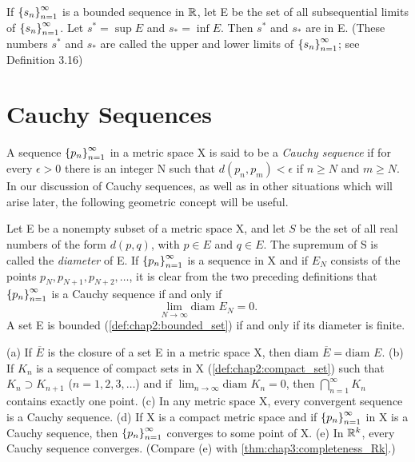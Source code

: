 \begin{theorem} %
  \label{thm:chap3:bounded_seq_lim_sup_inf_exist}
  If $\left\{ s_n \right\}_{n=1}^\infty$ is a bounded sequence in $\mathbb{R}$, let E be the set
  of all subsequential limits of $\left\{ s_n \right\}_{n=1}^\infty$. Let $s^* = \sup E$
  and $s_* = \inf E$. Then $s^*$ and $s_*$ are in E.
  (These numbers $s^*$ and $s_*$ are called the upper and lower
  limits of $\left\{ s_n \right\}_{n=1}^\infty$; see Definition 3.16)
\end{theorem}

\section{Cauchy Sequences}
\label{sec:chap3:cauchy_sequences}

\begin{definition} %
  \label{def:chap3:cauchy_sequence}
  A sequence $\left\{ p_n \right\}_{n=1}^\infty$ in a metric space X is said to be a
  \emph{Cauchy sequence} if for every $\epsilon > 0$ there is an
  integer N such that $d(p_n, p_m) < \epsilon$ if $n \ge N$ and $m \ge N$.
  In our discussion of Cauchy sequences, as well as in other
  situations which will arise later, the following geometric concept
  will be useful.
\end{definition}

\begin{definition} %
  \label{def:chap3:diameter_bounded}
  Let E be a nonempty subset of a metric space X, and let $S$ be the
  set of all real numbers of the form $d(p, q)$, with $p \in E$ and
  $q \in E$. The supremum of S is called the \emph{diameter} of E.
  If $\left\{ p_n \right\}_{n=1}^\infty$ is a sequence in X and if $E_N$ consists of the
  points $p_N, p_{N+1}, p_{N+2}, \dots$, it is clear from the two
  preceding definitions that $\left\{ p_n \right\}_{n=1}^\infty$ is a Cauchy sequence if and only if
  \[ \lim_{N \to \infty} \text{diam } E_N = 0. \]
  A set E is bounded (\autoref{def:chap2:bounded_set}) if and only if
  its diameter is finite.
\end{definition}

\begin{theorem} %
  \label{thm:chap3:cauchy_props}
  (a) If $\overline{E}$ is the closure of a set E in a metric space
  X, then $\text{diam } \overline{E} = \text{diam } E$.
  (b) If $K_n$ is a sequence of compact sets in X
  (\autoref{def:chap2:compact_set}) such that $K_n \supset K_{n+1}$
  ($n=1, 2, 3, \dots$) and if $\lim_{n \to \infty} \text{diam } K_n =
  0$, then $\bigcap_{n=1}^\infty K_n$ contains exactly one point.
  (c) In any metric space X, every convergent sequence is a Cauchy sequence.
  (d) If X is a compact metric space and if $\left\{ p_n \right\}_{n=1}^\infty$ in X is a
  Cauchy sequence, then $\left\{ p_n \right\}_{n=1}^\infty$ converges to some point of X.
  (e) In $\mathbb{R}^k$, every Cauchy sequence converges.
  (Compare (e) with \autoref{thm:chap3:completeness_Rk}.)
\end{theorem}

